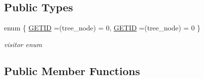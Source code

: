 \subsection*{Public Types}
\begin{DoxyCompactItemize}
\item 
enum \{ \hyperlink{structbinfo_aa40aecb0c52ec4b75f6a5abd614be31ba6ee51740d097757eed67fd70f06015f8}{G\+E\+T\+ID} =(tree\+\_\+node) = 0, 
\hyperlink{structbinfo_aa40aecb0c52ec4b75f6a5abd614be31ba6ee51740d097757eed67fd70f06015f8}{G\+E\+T\+ID} =(tree\+\_\+node) = 0
 \}\begin{DoxyCompactList}\small\item\em visitor enum \end{DoxyCompactList}
\end{DoxyCompactItemize}
\subsection*{Public Member Functions}
